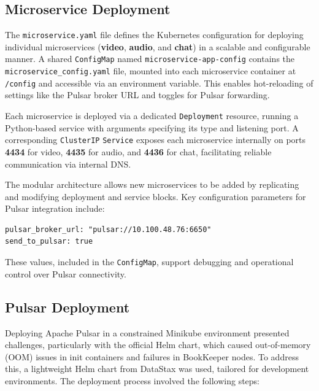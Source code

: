 \subsection{Microservice Deployment}
The \texttt{microservice.yaml} file defines the Kubernetes configuration for deploying individual microservices (\textbf{video}, \textbf{audio}, and \textbf{chat}) in a scalable and configurable manner. A shared \texttt{ConfigMap} named \texttt{microservice-app-config} contains the \texttt{microservice\_config.yaml} file, mounted into each microservice container at \texttt{/config} and accessible via an environment variable. This enables hot-reloading of settings like the Pulsar broker URL and toggles for Pulsar forwarding.

Each microservice is deployed via a dedicated \texttt{Deployment} resource, running a Python-based service with arguments specifying its type and listening port. A corresponding \texttt{ClusterIP} \texttt{Service} exposes each microservice internally on ports \textbf{4434} for video, \textbf{4435} for audio, and \textbf{4436} for chat, facilitating reliable communication via internal DNS.

The modular architecture allows new microservices to be added by replicating and modifying deployment and service blocks. Key configuration parameters for Pulsar integration include:

\begin{lstlisting}[breaklines=true,basicstyle=\small\ttfamily,frame=single]
pulsar_broker_url: "pulsar://10.100.48.76:6650"
send_to_pulsar: true
\end{lstlisting}

These values, included in the \texttt{ConfigMap}, support debugging and operational control over Pulsar connectivity.

\subsection{Pulsar Deployment}
Deploying Apache Pulsar in a constrained Minikube environment presented challenges, particularly with the official Helm chart, which caused out-of-memory (OOM) issues in init containers and failures in BookKeeper nodes. To address this, a lightweight Helm chart from DataStax was used, tailored for development environments. The deployment process involved the following steps:

